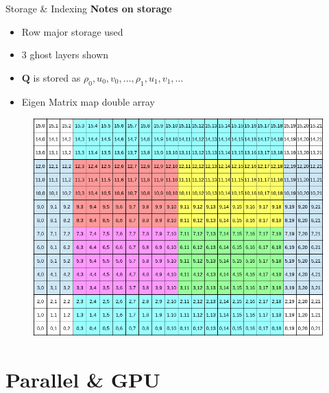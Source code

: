 \begin{frame}[t]{Storage \& Indexing}
  \minipage{\textwidth}
  \textbf{Notes on storage}
  \begin{itemize}
    \item Row major storage used 
    \item 3 ghost layers shown
    \item $\mathbf{Q}$ is stored as $\rho_0, u_0, v_0, \dots, \rho_1, u_1, v_1, \dots$
    \item Eigen Matrix map double array
  \end{itemize}


  \endminipage\hfill
 \begin{figure}[!htbp]
   \includegraphics[width=1.0\linewidth]{../fig/16x10compDomain}
   \centering
 \end{figure}
  \endminipage\hfill
  \endminipage

\end{frame}


\section{Parallel \& GPU}

